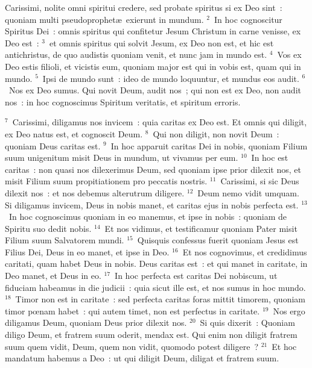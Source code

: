 \lettrine[lines=3,image=true,loversize=0.05,lraise=-0.03]{C}{}arissimi, nolite omni spiritui credere, sed probate spiritus si ex Deo sint~: quoniam multi pseudoprophet\ae\ exierunt in mundum.
${}^{2}$~In hoc cognoscitur Spiritus Dei~: omnis spiritus qui confitetur Jesum Christum in carne venisse, ex Deo est~:
${}^{3}$~et omnis spiritus qui solvit Jesum, ex Deo non est, et hic est antichristus, de quo audistis quoniam venit, et nunc jam in mundo est.
${}^{4}$~Vos ex Deo estis filioli, et vicistis eum, quoniam major est qui in vobis est, quam qui in mundo.
${}^{5}$~Ipsi de mundo sunt~: ideo de mundo loquuntur, et mundus eos audit.
${}^{6}$~Nos ex Deo sumus. Qui novit Deum, audit nos~; qui non est ex Deo, non audit nos~: in hoc cognoscimus Spiritum veritatis, et spiritum erroris.


${}^{7}$~Carissimi, diligamus nos invicem~: quia caritas ex Deo est. Et omnis qui diligit, ex Deo natus est, et cognoscit Deum.
${}^{8}$~Qui non diligit, non novit Deum~: quoniam Deus caritas est.
${}^{9}$~In hoc apparuit caritas Dei in nobis, quoniam Filium suum unigenitum misit Deus in mundum, ut vivamus per eum.
${}^{10}$~In hoc est caritas~: non quasi nos dilexerimus Deum, sed quoniam ipse prior dilexit nos, et misit Filium suum propitiationem pro peccatis nostris.
${}^{11}$~Carissimi, si sic Deus dilexit nos~: et nos debemus alterutrum diligere.
${}^{12}$~Deum nemo vidit umquam. Si diligamus invicem, Deus in nobis manet, et caritas ejus in nobis perfecta est.
${}^{13}$~In hoc cognoscimus quoniam in eo manemus, et ipse in nobis~: quoniam de Spiritu suo dedit nobis.
${}^{14}$~Et nos vidimus, et testificamur quoniam Pater misit Filium suum Salvatorem mundi.
${}^{15}$~Quisquis confessus fuerit quoniam Jesus est Filius Dei, Deus in eo manet, et ipse in Deo.
${}^{16}$~Et nos cognovimus, et credidimus caritati, quam habet Deus in nobis. Deus caritas est~: et qui manet in caritate, in Deo manet, et Deus in eo.
${}^{17}$~In hoc perfecta est caritas Dei nobiscum, ut fiduciam habeamus in die judicii~: quia sicut ille est, et nos sumus in hoc mundo.
${}^{18}$~Timor non est in caritate~: sed perfecta caritas foras mittit timorem, quoniam timor pœnam habet~: qui autem timet, non est perfectus in caritate.
${}^{19}$~Nos ergo diligamus Deum, quoniam Deus prior dilexit nos.
${}^{20}$~Si quis dixerit~: Quoniam diligo Deum, et fratrem suum oderit, mendax est. Qui enim non diligit fratrem suum quem vidit, Deum, quem non vidit, quomodo potest diligere~?
${}^{21}$~Et hoc mandatum habemus a Deo~: ut qui diligit Deum, diligat et fratrem suum.

